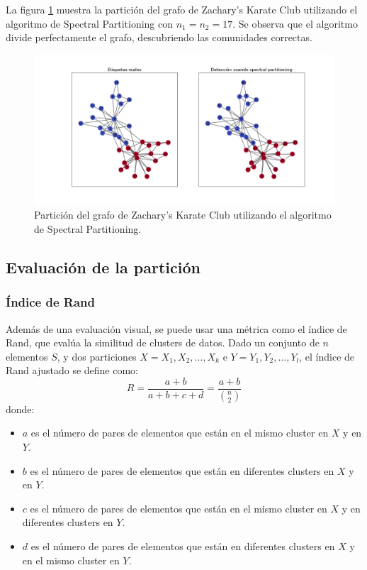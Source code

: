 \documentclass{article}
\begin{document}
La figura \ref{fig: spectral_partitioning} muestra la partición del grafo de Zachary's Karate Club utilizando el algoritmo de Spectral Partitioning con $n_1 = n_2 = 17$. Se observa que el algoritmo divide perfectamente el grafo, descubriendo las comunidades correctas.

\begin{figure}[htb]
    \centering
    \includegraphics[width=\textwidth]{imagenes/spectral_partitioning.png}
    \caption{Partición del grafo de Zachary's Karate Club utilizando el algoritmo de Spectral Partitioning.}
    \label{fig: spectral_partitioning}
\end{figure}

\subsection{Evaluación de la partición}

\subsubsection{Índice de Rand}

Además de una evaluación visual, se puede usar una métrica como el índice de Rand, que evalúa la similitud de clusters de datos. Dado un conjunto de $n$ elementos $S$, y dos particiones $X = {X_1, X_2, \ldots, X_k}$ e $Y = {Y_1, Y_2, \ldots, Y_l}$, el índice de Rand ajustado se define como:
\begin{equation*}
    R = \frac{a + b}{a + b + c + d} = \frac{a + b}{\binom{n}{2}}
\end{equation*}
donde:
\begin{itemize}
    \item $a$ es el número de pares de elementos que están en el mismo cluster en $X$ y en $Y$.
    \item $b$ es el número de pares de elementos que están en diferentes clusters en $X$ y en $Y$.
    \item $c$ es el número de pares de elementos que están en el mismo cluster en $X$ y en diferentes clusters en $Y$.
    \item $d$ es el número de pares de elementos que están en diferentes clusters en $X$ y en el mismo cluster en $Y$.
\end{itemize}
\end{document}
